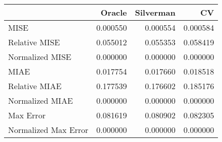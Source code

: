 \begin{tabular}{lrrr}
  \hline
 & Oracle & Silverman & CV \\ 
  \hline
MISE & 0.000550 & 0.000554 & 0.000584 \\ 
  Relative MISE & 0.055012 & 0.055353 & 0.058419 \\ 
  Normalized MISE & 0.000000 & 0.000000 & 0.000000 \\ 
  MIAE & 0.017754 & 0.017660 & 0.018518 \\ 
  Relative MIAE & 0.177539 & 0.176602 & 0.185176 \\ 
  Normalized MIAE & 0.000000 & 0.000000 & 0.000000 \\ 
  Max Error & 0.081619 & 0.080902 & 0.082305 \\ 
  Normalized Max Error & 0.000000 & 0.000000 & 0.000000 \\ 
   \hline
\end{tabular}
